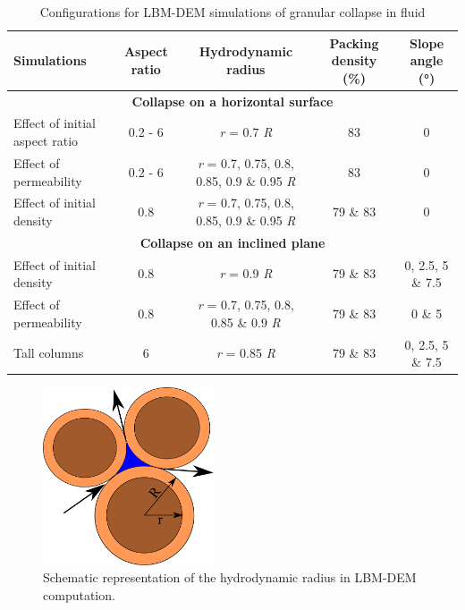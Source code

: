\begin{landscape}
\centering
\begin{table}
\centering
\caption{Configurations for LBM-DEM simulations of granular collapse in fluid}
\label{table:lbm-dem-setup}
\begin{tabular}{lcccc}
\toprule
\textbf{Simulations} & \textbf{Aspect ratio} & \textbf{Hydrodynamic radius} & 
\textbf{Packing density (\%)} & \textbf{Slope angle (\si{\degree})}\\ \midrule
\multicolumn{5}{c}{\textbf{Collapse on a horizontal surface}} \\
Effect of initial aspect ratio & 0.2 - 6 & \textit{r} = 0.7 \textit{R} &  83 & 
0 \\
Effect of permeability & 0.2 - 6 & \textit{r} = 0.7, 0.75, 0.8, 0.85, 0.9 \& 
0.95 \textit{R} &  
83 & 0 \\
Effect of initial density & 0.8 & \textit{r} = 0.7, 0.75, 0.8, 0.85, 0.9 \& 
0.95 \textit{R} 
& 79 \& 83 & 0 \\ \midrule
\multicolumn{5}{c}{\textbf{Collapse on an inclined plane}} \\
Effect of initial density & 0.8 & \textit{r} = 0.9 \textit{R} & 79 \& 83 & 0, 
2.5, 5 \& 7.5 
\\
Effect of permeability & 0.8 & \textit{r} = 0.7, 0.75, 0.8, 0.85 \& 0.9 
\textit{R} &  79 \& 
83 & 0 \& 5 \\ \midrule
Tall columns & 6 & \textit{r} = 0.85 \textit{R} & 79 \& 83 & 0, 2.5, 5 \& 7.5 \\
\bottomrule
\end{tabular}
\end{table}
\end{landscape}

\begin{figure}[tbhp]
\centering
\includegraphics[width=0.45\textwidth]{reduction}
\caption{Schematic representation of the hydrodynamic radius in LBM-DEM 
computation.}
\label{fig:reduction}
\end{figure}

